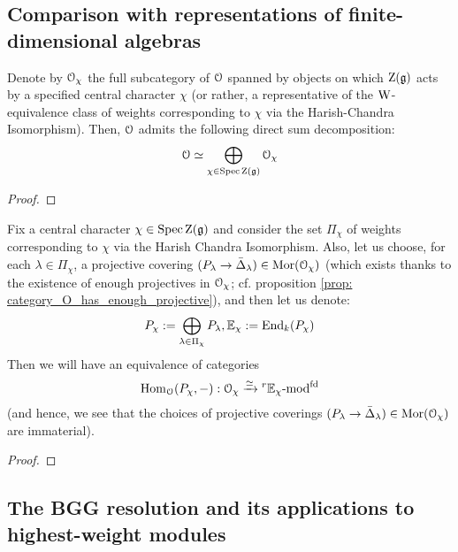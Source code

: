     \subsection{Comparison with representations of finite-dimensional algebras}
        \begin{theorem} \label{theorem: block_decomposition_of_category_O}
            Denote by $\mathcal{O}_{\chi}$ the full subcategory of $\mathcal{O}$ spanned by objects on which $\mathrm{Z}(\mathfrak{g})$ acts by a specified central character $\chi$ (or rather, a representative of the $\mathrm{W}$-equivalence class of weights corresponding to $\chi$ via the Harish-Chandra Isomorphism). Then, $\mathcal{O}$ admits the following direct sum decomposition:
                $$\mathcal{O} \simeq \bigoplus_{\chi \in \operatorname{Spec} \mathrm{Z}(\mathfrak{g})} \mathcal{O}_{\chi}$$
        \end{theorem}
            \begin{proof}
                
            \end{proof}
        \begin{proposition} \label{prop: morita_equivalences_for_blocks_of_category_O}
            Fix a central character $\chi \in \operatorname{Spec} \mathrm{Z}(\mathfrak{g})$ and consider the set $\Pi_{\chi}$ of weights corresponding to $\chi$ via the Harish Chandra Isomorphism. Also, let us choose, for each $\lambda \in \Pi_{\chi}$, a projective covering $(P_{\lambda} \to \bar{\Delta}_{\lambda}) \in \mathrm{Mor}(\mathcal{O}_{\chi})$ (which exists thanks to the existence of enough projectives in $\mathcal{O}_{\chi}$; cf. proposition \ref{prop: category_O_has_enough_projective}), and then let us denote:
                $$P_{\chi} := \bigoplus_{\lambda \in \Pi_{\chi}} P_{\lambda}, \mathbb{E}_{\chi} := \mathrm{End}_k( P_{\chi} )$$
            Then we will have an equivalence of categories
                $$\mathrm{Hom}_{\mathcal{O}}(P_{\chi}, -): \mathcal{O}_{\chi} \xrightarrow[]{\simeq} {}^r\mathbb{E}_{\chi}\text{-}\mathrm{mod}^{\mathrm{fd}}$$
            (and hence, we see that the choices of projective coverings $(P_{\lambda} \to \bar{\Delta}_{\lambda}) \in \mathrm{Mor}(\mathcal{O}_{\chi})$ are immaterial). 
        \end{proposition}
            \begin{proof}
                
            \end{proof}

    \subsection{The BGG resolution and its applications to highest-weight modules}